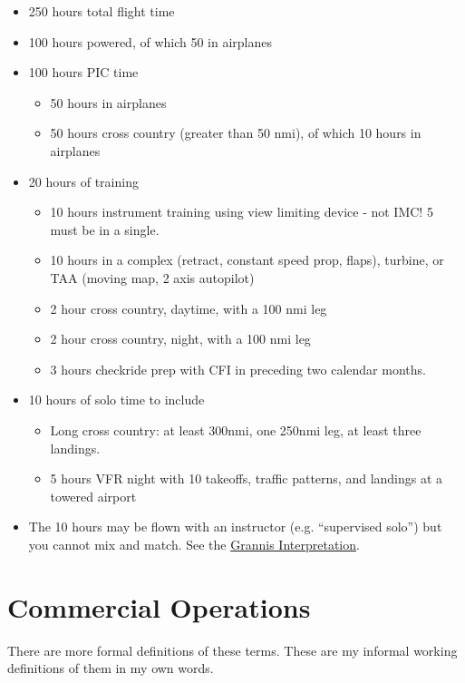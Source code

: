 \begin{itemize}
\item 250 hours total flight time
\item 100 hours powered, of which 50 in airplanes
\item 100 hours PIC time
      \begin{itemize}
      \item 50 hours in airplanes
      \item 50 hours cross country (greater than 50 nmi), of which 10 hours in airplanes
      \end{itemize}
\item 20 hours of training
      \begin{itemize}
      \item 10 hours instrument training using view limiting device - not IMC! 5 must be in a single.
      \item 10 hours in a complex (retract, constant speed prop, flaps), turbine, or TAA (moving map, 2 axis autopilot)
      \item 2 hour cross country, daytime, with a 100 nmi leg
      \item 2 hour cross country, night, with a 100 nmi leg
      \item 3 hours checkride prep with CFI in preceding two calendar months.
      \end{itemize}
\item 10 hours of solo time to include
      \begin{itemize}
      \item Long cross country: at least 300nmi, one 250nmi leg, at least three landings.
      \item 5 hours VFR night with 10 takeoffs, traffic patterns, and landings at a towered airport
      \end{itemize}
  \item The 10 hours may be flown with an instructor (e.g. ``supervised solo'') but you cannot mix and match. See the \href{https://www.faa.gov/about/office_org/headquarters_offices/agc/practice_areas/regulations/interpretations/Data/interps/2016/Grannis_2016_Legal_Interpretation.pdf}{Grannis Interpretation}.
\end{itemize}


\section{Commercial Operations}

There are more formal definitions of these terms. These are my informal working definitions of them in my own words.

